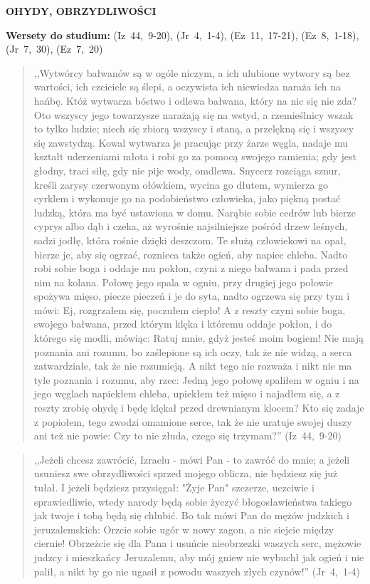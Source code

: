 \documentclass[10pt,a4paper,oneside]{article}
\begin{document}
\centerline{\textbf{\MakeUppercase{Ohydy, obrzydliwości}}}
\begin{center}
\textbf{Wersety do studium:} \mbox{(Iz 44, 9-20)}, \mbox{(Jr 4, 1-4)}, \mbox{(Ez 11, 17-21)}, \mbox{(Ez 8, 1-18)}, \mbox{(Jr 7, 30)}, \mbox{(Ez 7, 20)}
\end{center}
\begin{quote}
,,Wytwórcy bałwanów są w ogóle niczym, a ich ulubione wytwory są bez wartości, ich czciciele są ślepi, a oczywista ich niewiedza naraża ich na hańbę. Któż wytwarza bóstwo i odlewa bałwana, który na nic się nie zda? Oto wszyscy jego towarzysze narażają się na wstyd, a rzemieślnicy wszak to tylko ludzie; niech się zbiorą wszyscy i staną, a przelękną się i wszyscy się zawstydzą. Kowal wytwarza je pracując przy żarze węgla, nadaje mu kształt uderzeniami młota i robi go za pomocą swojego ramienia; gdy jest głodny, traci siłę, gdy nie pije wody, omdlewa. Snycerz rozciąga sznur, kreśli zarysy czerwonym ołówkiem, wycina go dłutem, wymierza go cyrklem i wykonuje go na podobieństwo człowieka, jako piękną postać ludzką, która ma być ustawiona w domu. Narąbie sobie cedrów lub bierze cyprys albo dąb i czeka, aż wyrośnie najsilniejsze pośród drzew leśnych, sadzi jodłę, która rośnie dzięki deszczom. Te służą człowiekowi na opał, bierze je, aby się ogrzać, roznieca także ogień, aby napiec chleba. Nadto robi sobie boga i oddaje mu pokłon, czyni z niego bałwana i pada przed nim na kolana. Połowę jego spala w ogniu, przy drugiej jego połowie spożywa mięso, piecze pieczeń i je do syta, nadto ogrzewa się przy tym i mówi: Ej, rozgrzałem się, poczułem ciepło! A z reszty czyni sobie boga, swojego bałwana, przed którym klęka i któremu oddaje pokłon, i do którego się modli, mówiąc: Ratuj mnie, gdyż jesteś moim bogiem! Nie mają poznania ani rozumu, bo zaślepione są ich oczy, tak że nie widzą, a serca zatwardziałe, tak że nie rozumieją. A nikt tego nie rozważa i nikt nie ma tyle poznania i rozumu, aby rzec: Jedną jego połowę spaliłem w ogniu i na jego węglach napiekłem chleba, upiekłem też mięso i najadłem się, a z reszty zrobię ohydę i będę klękał przed drewnianym klocem? Kto się zadaje z popiołem, tego zwodzi omamione serce, tak że nie uratuje swojej duszy ani też nie powie: Czy to nie złuda, czego się trzymam?'' \mbox{(Iz 44, 9-20)}
\end{quote}
\begin{quote}
,,Jeżeli chcesz zawrócić, Izraelu - mówi Pan - to zawróć do mnie; a jeżeli usuniesz swe obrzydliwości sprzed mojego oblicza, nie będziesz się już tułał. I jeżeli będziesz przysięgał: "Żyje Pan" szczerze, uczciwie i sprawiedliwie, wtedy narody będą sobie życzyć błogosławieństwa takiego jak twoje i tobą będą się chlubić. Bo tak mówi Pan do mężów judzkich i jeruzalemskich: Orzcie sobie ugór w nowy zagon, a nie siejcie między ciernie! Obrzeżcie się dla Pana i usuńcie nieobrzezki waszych serc, mężowie judzcy i mieszkańcy Jeruzalemu, aby mój gniew nie wybuchł jak ogień i nie palił, a nikt by go nie ugasił z powodu waszych złych czynów!'' \mbox{(Jr 4, 1-4)}
\end{quote}
\end{document}
